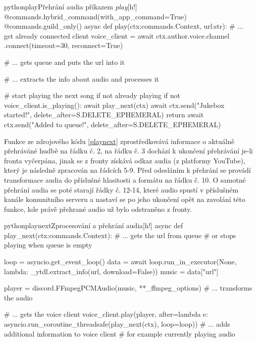 \documentclass[
  program=inf,
biblatex=false,
sourcecodes=true,
joinlists=true,
  figures=true,
  tables=true,
  glossaries=true,
  index=false
]{kidiplom}
\begin{document}
\begin{kicode}{python}{play}{Přehrání audia příkazem {\it play}}[h!]
  @commands.hybrid_command(with_app_command=True)
  @commands.guild_only()
  async def play(ctx:commands.Context, url:str):
      # ... get already connected client
      voice_client = await ctx.author.voice.channel
                      .connect(timeout=30, reconnect=True)
  
      # ... gets queue and puts the url into it
      
      # ... extracts the info about audio and processes it
  
      # start playing the next song if not already playing
      if not voice_client.is_playing():
          await play_next(ctx)
          await ctx.send("Jukebox started!",
                      delete_after=S.DELETE_EPHEMERAL)
          return
      await ctx.send("Added to queue!", 
                     delete_after=S.DELETE_EPHEMERAL)  
\end{kicode}

\newpage
Funkce ze zdrojového kódu \ref{playnext} zprostředkovává informace o aktuálně přehráváné hudbě
na řádku č. 2, na řádku č. 3 dochází k ukončení přehrávání je-li fronta vyčerpána, jinak
se z fronty získává odkaz audia (z platformy YouTube), který je následně zpracován na řádcích 5-9. 
Před odesláním k přehrání se provádí transformace audia do příslušné hlasitosti a formátu na řádku č. 10.
O samotné přehrání audia se poté starají řádky č. 12-14, které audio spustí v příslušném kanále komunitního serveru
a nastaví se po jeho ukončení opět na zavolání této funkce, kde právě přehrané audio už bylo odstraněno z fronty.


\begin{kicode}{python}{playnext}{Zprocesování a přehrání audia}[h!]
  async def play_next(ctx:commands.Context):
    # ... gets the url from queue
    # or stops playing when queue is empty
    
    loop = asyncio.get_event_loop()
    data = await loop.run_in_executor(None, lambda: _ytdl.extract_info(url, download=False))
    music = data["url"]
    
    player = discord.FFmpegPCMAudio(music, **_ffmpeg_options)
    # ... transforms the audio
        
    # ... gets the voice client
    voice_client.play(player, after=lambda e:
        asyncio.run_coroutine_threadsafe(play_next(ctx), loop=loop))
    # ... adds additional information to voice client
    # for example currently playing audio
\end{kicode}
\end{document}
